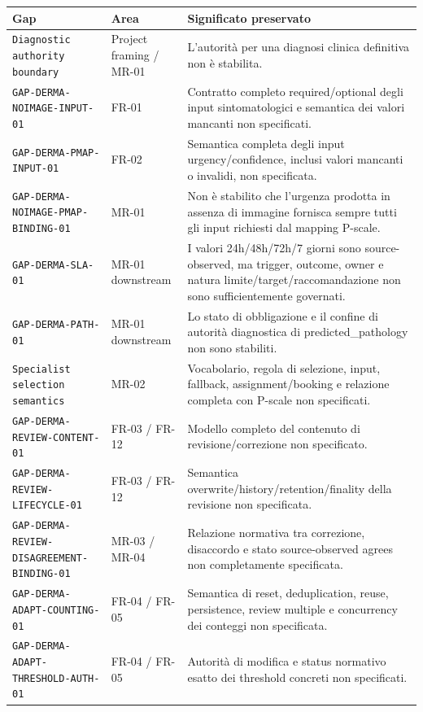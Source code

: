 \documentclass[11pt,a4paper]{article}
\begin{document}
\small
\begin{longtable}{L{50mm}L{29mm}L{64mm}}
\toprule
\textbf{Gap} & \textbf{Area} & \textbf{Significato preservato} \\
\midrule
\endhead
\texttt{Diagnostic authority boundary} & Project framing / MR-01 & L'autorità per una diagnosi clinica definitiva non è stabilita. \\
\nolinkurl{GAP-DERMA-NOIMAGE-INPUT-01} & FR-01 & Contratto completo required/optional degli input sintomatologici e semantica dei valori mancanti non specificati. \\
\nolinkurl{GAP-DERMA-PMAP-INPUT-01} & FR-02 & Semantica completa degli input urgency/confidence, inclusi valori mancanti o invalidi, non specificata. \\
\nolinkurl{GAP-DERMA-NOIMAGE-PMAP-BINDING-01} & MR-01 & Non è stabilito che l'urgenza prodotta in assenza di immagine fornisca sempre tutti gli input richiesti dal mapping P-scale. \\
\nolinkurl{GAP-DERMA-SLA-01} & MR-01 downstream & I valori 24h/48h/72h/7 giorni sono source-observed, ma trigger, outcome, owner e natura limite/target/raccomandazione non sono sufficientemente governati. \\
\nolinkurl{GAP-DERMA-PATH-01} & MR-01 downstream & Lo stato di obbligazione e il confine di autorità diagnostica di predicted\_pathology non sono stabiliti. \\
\texttt{Specialist selection semantics} & MR-02 & Vocabolario, regola di selezione, input, fallback, assignment/booking e relazione completa con P-scale non specificati. \\
\nolinkurl{GAP-DERMA-REVIEW-CONTENT-01} & FR-03 / FR-12 & Modello completo del contenuto di revisione/correzione non specificato. \\
\nolinkurl{GAP-DERMA-REVIEW-LIFECYCLE-01} & FR-03 / FR-12 & Semantica overwrite/history/retention/finality della revisione non specificata. \\
\nolinkurl{GAP-DERMA-REVIEW-DISAGREEMENT-BINDING-01} & MR-03 / MR-04 & Relazione normativa tra correzione, disaccordo e stato source-observed agrees non completamente specificata. \\
\nolinkurl{GAP-DERMA-ADAPT-COUNTING-01} & FR-04 / FR-05 & Semantica di reset, deduplication, reuse, persistence, review multiple e concurrency dei conteggi non specificata. \\
\nolinkurl{GAP-DERMA-ADAPT-THRESHOLD-AUTH-01} & FR-04 / FR-05 & Autorità di modifica e status normativo esatto dei threshold concreti non specificati. \\

\end{longtable}
\end{document}
